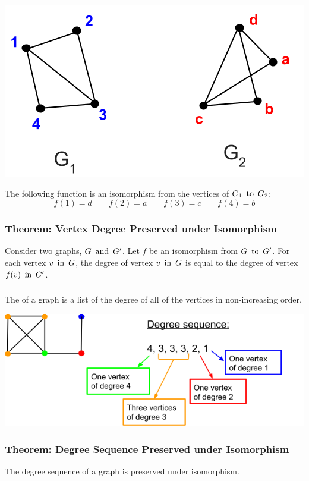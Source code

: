 \begin{center}
  \includegraphics[width=0.5\linewidth]{resources/isomorphic graphs 1.png}
\end{center}
The following function is an isomorphism from the vertices of $G_1 \operatorname{~\text{to}~} G_2$:
\[
  f(1) = d \qquad f(2) = a \qquad f(3) = c \qquad f(4) = b
\]

\subsubsection*{Theorem: Vertex Degree Preserved under Isomorphism}
Consider two graphs, $G \operatorname{~\text{and}~} G'$. Let $f$ be an isomorphism from $G \operatorname{~\text{to}~} G'$. For each vertex $v \operatorname{~\text{in}~} G$, the degree of vertex $v \operatorname{~\text{in}~} G$ is equal to the degree of vertex $f(v) \operatorname{~\text{in}~} G'$.

\subsubsection*{}
The  of a graph is a list of the degree of all of the vertices in non-increasing order.
\begin{center}
  \includegraphics[width=0.7\linewidth]{resources/degree-sequence.png}
\end{center}

\subsubsection*{Theorem: Degree Sequence Preserved under Isomorphism}
The degree sequence of a graph is preserved under isomorphism.


